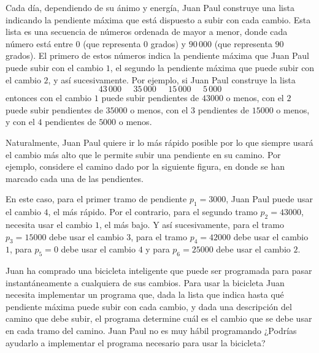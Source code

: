 \documentclass{oci}
\begin{document}
\begin{problemDescription}
Cada día, dependiendo de su ánimo y energía, Juan Paul construye una lista indicando la pendiente 
máxima que está dispuesto a 
subir con cada cambio. 
Esta lista es una secuencia de números ordenada de mayor a menor, donde cada
número está entre $0$ (que representa $0$ grados) y $90\,000$ (que representa
$90$ grados).
El primero de estos números indica la pendiente máxima que Juan Paul puede 
subir con el cambio $1$, el segundo la pendiente máxima que puede 
subir con el cambio $2$, y así sucesivamente.
Por ejemplo, si Juan Paul construye la lista
\[
43\, 000\;\;\;\;\; 35\, 000\;\;\;\;\; 15\, 000\;\;\;\;\; 5\, 000
\]
entonces con el cambio $1$ puede subir pendientes de $43000$ o menos, con el 
$2$ puede subir pendientes de $35000$ o menos, con el $3$ pendientes de
$15000$ o menos, y con el $4$ pendientes de $5000$ o menos.

Naturalmente, Juan Paul quiere ir lo más rápido posible por lo que 
siempre usará el cambio más alto que le permite subir
una pendiente en su camino.
Por ejemplo, considere el camino dado por la siguiente figura, en donde se han marcado
cada una de las pendientes.
\begin{center}

\end{center}

En este caso, para el primer tramo de pendiente $p_1=3000$, Juan Paul puede usar el cambio $4$, 
el más rápido.
Por el contrario, para el segundo tramo $p_2=43 000$, necesita usar el cambio $1$, el más bajo. 
Y así sucesivamente, para el tramo $p_3=15 000$ debe usar el cambio $3$, para el tramo $p_4=42 000$
debe usar el cambio $1$, para $p_5=0$ debe usar el cambio $4$ y para $p_6=25 000$ debe usar
el cambio $2$.

Juan ha comprado una bicicleta inteligente que puede ser programada para 
pasar instantáneamente a cualquiera de sus cambios. 
Para usar la bicicleta Juan necesita implementar un programa que, dada
la lista que indica hasta qué pendiente máxima puede subir con cada cambio,
y dada una descripción del camino que debe subir,
el programa determine cuál es el cambio que se debe usar en cada tramo del camino.
Juan Paul no es muy hábil programando ¿Podrías ayudarlo a implementar el
programa necesario para usar la bicicleta?
 


\end{problemDescription}
\end{document}
